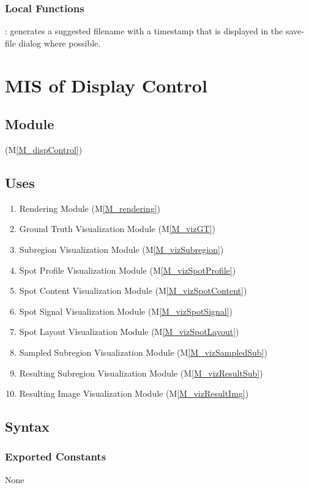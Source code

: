 \documentclass[12pt, titlepage]{article}
\newcommand{\mref}[1]{M\ref{#1}}
\newcommand{\mrefp}[1]{(\mref{#1})}
\newcommand{\mreff}[1]{Module \mrefp{#1}}
\begin{document}
\subsubsection{Local Functions}
: generates a suggested filename with a timestamp
that is displayed in the save-file dialog where possible.

\newpage



\section{MIS of Display Control} \label{MS_dispControl}

\subsection{Module}
 \mrefp{M_dispControl}

\subsection{Uses} \label{USES_dispControl}
\begin{enumerate}
  \item Rendering \mreff{M_rendering}
  \item Ground Truth Visualization \mreff{M_vizGT}
  \item Subregion Visualization \mreff{M_vizSubregion}
  \item Spot Profile Visualization \mreff{M_vizSpotProfile}
  \item Spot Content Visualization \mreff{M_vizSpotContent}
  \item Spot Signal Visualization \mreff{M_vizSpotSignal}
  \item Spot Layout Visualization \mreff{M_vizSpotLayout}
  \item Sampled Subregion Visualization \mreff{M_vizSampledSub}
  \item Resulting Subregion Visualization \mreff{M_vizResultSub}
  \item Resulting Image Visualization \mreff{M_vizResultImg}
\end{enumerate}

\subsection{Syntax}

\subsubsection{Exported Constants}
None
\end{document}
